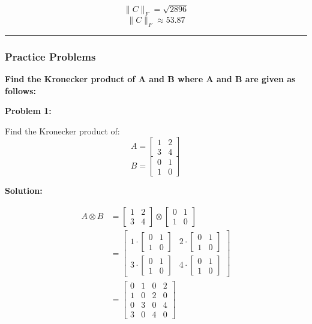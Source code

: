 \documentclass[
  letterpaper,
  DIV=11,
  numbers=noendperiod]{scrreprt}
\theoremstyle{plain}
\theoremstyle{definition}
\theoremstyle{remark}
\begin{document}
\[\|C\|_F = \sqrt{2896}\] \[\|C\|_F \approx 53.87\]

\begin{center}\rule{0.5\linewidth}{0.5pt}\end{center}

\subsubsection{Practice Problems}\label{practice-problems-4}

\textbf{Find the Kronecker product of A and B where A and B are given as
follows:}

\textbf{Problem 1:}

Find the Kronecker product of:
\[A=\begin{bmatrix}1&2\\3&4\end{bmatrix}\]
\[B=\begin{bmatrix}0&1\\1&0\end{bmatrix}\]

\textbf{Solution:}

\begin{align*}
A \otimes B &= \begin{bmatrix}1&2\\3&4\end{bmatrix} \otimes \begin{bmatrix}0&1\\1&0\end{bmatrix} \\
&= \begin{bmatrix}
1 \cdot \begin{bmatrix}0&1\\1&0\end{bmatrix} & 2 \cdot \begin{bmatrix}0&1\\1&0\end{bmatrix} \\
3 \cdot \begin{bmatrix}0&1\\1&0\end{bmatrix} & 4 \cdot \begin{bmatrix}0&1\\1&0\end{bmatrix}
\end{bmatrix} \\
&= \begin{bmatrix}
0 & 1 & 0 & 2 \\
1 & 0 & 2& 0\\
0 & 3 & 0 & 4 \\
3 & 0 & 4 & 0
\end{bmatrix}
\end{align*}
\end{document}
